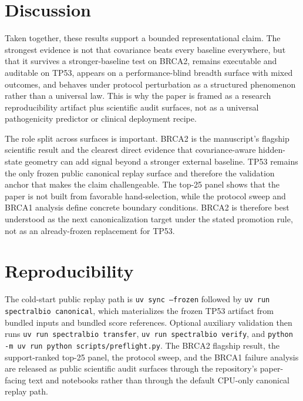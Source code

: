 \documentclass[10pt,twocolumn,letterpaper]{article}
\begin{document}
\section{Discussion}\label{sec:discussion}

Taken together, these results support a bounded representational claim. The strongest
evidence is not that covariance beats every baseline everywhere, but that it survives a
stronger-baseline test on BRCA2, remains executable and auditable on TP53, appears on a
performance-blind breadth surface with mixed outcomes, and behaves under protocol
perturbation as a structured phenomenon rather than a universal law. This is why the
paper is framed as a research reproducibility artifact plus scientific audit surfaces,
not as a universal pathogenicity predictor or clinical deployment recipe.

The role split across surfaces is important. BRCA2 is the manuscript's flagship
scientific result and the clearest direct evidence that covariance-aware hidden-state
geometry can add signal beyond a stronger external baseline. TP53 remains the only
frozen public canonical replay surface and therefore the validation anchor that makes
the claim challengeable. The top-25 panel shows that the paper is not built from
favorable hand-selection, while the protocol sweep and BRCA1 analysis define concrete
boundary conditions. BRCA2 is therefore best understood as the next canonicalization
target under the stated promotion rule, not as an already-frozen replacement for TP53.

\section{Reproducibility}

The cold-start public replay path is \texttt{uv sync --frozen} followed by
\texttt{uv run spectralbio canonical}, which materializes the frozen TP53 artifact from
bundled inputs and bundled score references. Optional auxiliary validation then runs
\texttt{uv run spectralbio transfer}, \texttt{uv run spectralbio verify}, and
\texttt{python -m uv run python scripts/preflight.py}. The BRCA2 flagship result, the
support-ranked top-25 panel, the protocol sweep, and the BRCA1 failure analysis are
released as public scientific audit surfaces through the repository's paper-facing text
and notebooks rather than through the default CPU-only canonical replay path.
\end{document}
